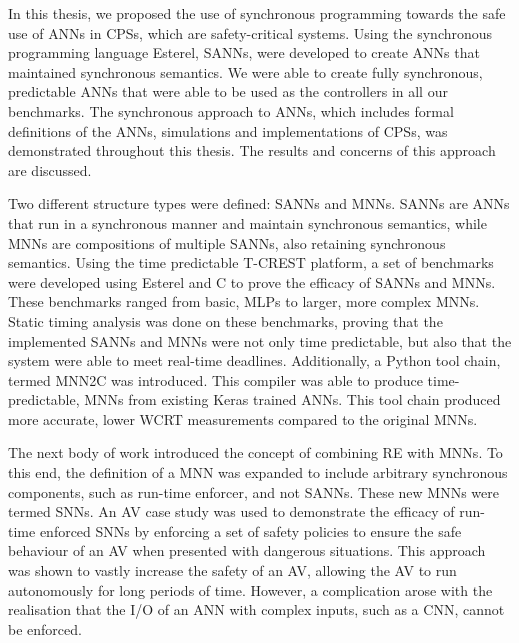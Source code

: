 In this thesis, we proposed the use of synchronous programming towards the safe use of \acfp{ANN} in \acfp{CPS}, which are safety-critical systems.
Using the synchronous programming language Esterel, \acfp{SANN}, were developed to create \acp{ANN} that maintained synchronous semantics.
We were able to create fully synchronous, predictable \acp{ANN} that were able to be used as the controllers in all our benchmarks.
The synchronous approach to \acp{ANN}, which includes formal definitions of the \acp{ANN}, simulations and implementations of \acp{CPS}, was demonstrated throughout this thesis.
The results and concerns of this approach are discussed.

Two different structure types were defined: \acp{SANN} and \acp{MNN}.
\acp{SANN} are \acp{ANN} that run in a synchronous manner and maintain synchronous semantics, while \acp{MNN} are compositions of multiple \acp{SANN}, also retaining synchronous semantics.
Using the time predictable T-CREST platform, a set of benchmarks were developed using Esterel and C to prove the efficacy of \acp{SANN} and \acp{MNN}. 
These benchmarks ranged from basic, \acfp{MLP} to larger, more complex \acfp{MNN}.
Static timing analysis was done on these benchmarks, proving that the implemented \acp{SANN} and \acp{MNN} were not only time predictable, but also that the system were able to meet real-time deadlines.
Additionally, a Python tool chain, termed \acf{MNN2C} was introduced.
This compiler was able to produce time-predictable, \acp{MNN} from existing Keras trained \acp{ANN}.
This tool chain produced more accurate, lower \acf{WCRT} measurements compared to the original \acp{MNN}.

The next body of work introduced the concept of combining \acf{RE} with \acp{MNN}.
To this end, the definition of a \ac{MNN} was expanded to include arbitrary synchronous components, such as run-time enforcer, and not \acp{SANN}.
These new \acp{MNN} were termed \acfp{SNN}.
An \ac{AV} case study was used to demonstrate the efficacy of run-time enforced \acp{SNN} by enforcing a set of safety policies to ensure the safe behaviour of an \ac{AV} when presented with dangerous situations.
This approach was shown to vastly increase the safety of an \ac{AV}, allowing the \ac{AV} to run autonomously for long periods of time.
However, a complication arose with the realisation that the I/O of an \ac{ANN} with complex inputs, such as a \acf{CNN}, cannot be enforced.

